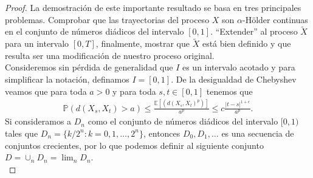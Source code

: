 \begin{proof}
La demostración de este importante resultado se basa en tres principales problemas. Comprobar que las trayectorias del proceso $X$ son $\alpha$-Hölder continuas en el conjunto de números diádicos del intervalo $[0,1]$. ``Extender'' al proceso $\tilde{X}$ para un intervalo $[0, T]$, finalmente, mostrar que $\tilde{X}$ está bien definido y que resulta ser una modificación de nuestro proceso original. \\

Consideremos sin pérdida de generalidad que $I$ es un intervalo acotado y para simplificar la notación, definamos $I = [0, 1]$. De la desigualdad de Chebyshev veamos que para toda $a > 0$ y para toda $s, t \in [0, 1]$ tenemos que
	\begin{align}
	\mathbb{P} \left(d(X_s, X_t) > a \right) \leq \frac{\mathbb{E} \left[\left(d(X_s, X_t)^p\right)\right]}{a^p} \leq c \frac{|t-s|^{1+\epsilon}}{a^p}.\label{aca} 
	\end{align}
Si consideramos a $D_n$ como el conjunto de números diádicos del intervalo $[0, 1)$ tales que $D_n = \{k / 2^n : k = 0, 1, \ldots, 2^n\}$, entonces $D_0, D_1, \ldots $ es una secuencia de conjuntos crecientes, por lo que podemos definir al siguiente conjunto $D = \cup_n D_n = \lim_n D_n$. \\


\end{proof}
